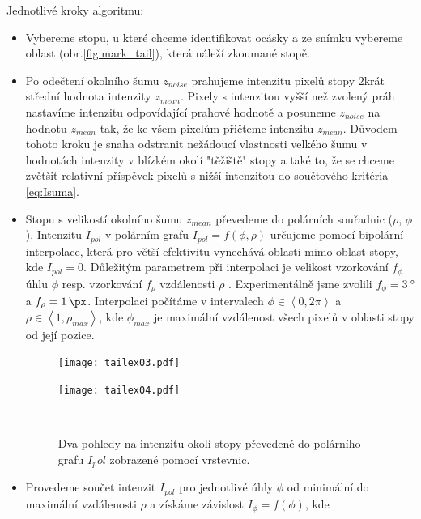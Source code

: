 Jednotlivé kroky algoritmu: 
	\begin{itemize}
	\item Vybereme stopu, u které chceme identifikovat ocásky a ze snímku vybereme oblast (obr.\ref{fig:mark_tail}), která náleží zkoumané stopě. 
	
	\item Po odečtení okolního šumu $z_{noise}$ prahujeme intenzitu pixelů stopy $2$krát střední hodnota intenzity $z_{mean}$. Pixely s intenzitou vyšší než zvolený práh nastavíme intenzitu odpovídající prahové hodnotě a posuneme $z_{noise}$ na hodnotu $z_{mean}$ tak, že ke všem pixelům přičteme intenzitu $z_{mean}$. Důvodem tohoto kroku je snaha odstranit nežádoucí vlastnosti velkého šumu v hodnotách intenzity v blízkém okolí "těžiště" stopy a také to, že se chceme zvětšit relativní příspěvek pixelů s nižší intenzitou do součtového kritéria \ref{eq:Isuma}.   
	
	\item Stopu s velikostí okolního šumu $z_{mean}$ převedeme do polárních souřadnic ($\rho$, $\phi$). Intenzitu $I_{pol}$ v polárním grafu $I_{pol} = f(\phi,\rho)$ určujeme pomocí bipolární interpolace, která pro větší efektivitu vynechává oblasti mimo oblast stopy, kde $I_{pol} = 0$. Důležitým parametrem při interpolaci je velikost vzorkování $f_{\phi}$ úhlu $\phi$ resp. vzorkování $f_{\rho}$ vzdálenosti $\rho$ . Experimentálně jsme zvolili $f_{\phi} = \SI{3}{\degree}$ a $f_{\rho} = \SI{1}{\px}$. Interpolaci počítáme v intervalech  $\phi \in \left\langle 0,2\pi \right\rangle$ a $\rho \in \left\langle 1,\rho_{max} \right\rangle$, kde $\phi_{max}$ je maximální vzdálenost všech pixelů v oblasti stopy od její pozice.  
	
	\begin{figure}[htbp]
    \centering
    \begin{minipage}[c]{0.48\textwidth}
        \centering\texttt{[image: tailex03.pdf]}
    \end{minipage}
    \begin{minipage}[c]{0.48\textwidth}
        \centering\texttt{[image: tailex04.pdf]}
    \end{minipage}
    \\
        \caption[Detektor ocásků - polární graf.]{Dva pohledy na intenzitu okolí stopy převedené do polárního grafu $I_pol$ zobrazené pomocí vrstevnic.}
        \label{Detekce}
\end{figure}
	
	\item Provedeme součet intenzit $I_{pol}$ pro jednotlivé úhly $\phi$ od minimální do maximální vzdálenosti $\rho$ a získáme závislost $I_\phi = f(\phi)$, kde  
	

\end{itemize}
